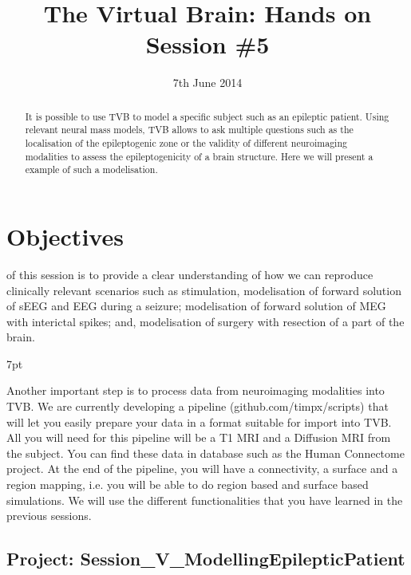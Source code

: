 \documentclass{tufte-handout}
\title{The Virtual Brain: Hands on Session \#5}
\date{7th June 2014}
\newenvironment{blah}{%
  \def\FrameCommand{%
    \hspace{1pt}%
    {\color{DarkOrange}\vrule width 2pt}%
    {\color{PeachPuff}\vrule width 4pt}%
    \colorbox{PeachPuff}%
  }%
  \MakeFramed{\advance\hsize-\width\FrameRestore}%
  \noindent\hspace{-4.55pt}%
  \begin{adjustwidth}{}{7pt}%
  \vspace{2pt}\vspace{2pt}%
}
{%
  \vspace{2pt}\end{adjustwidth}\endMakeFramed%
}
\begin{document}

\newpage
\ClearWallPaper


\begin{abstract}
\noindent It is possible to use TVB to model a specific subject such as an epileptic patient. Using relevant neural
mass models, TVB allows to ask multiple questions such as the localisation of the epileptogenic zone or the validity
of different neuroimaging modalities to assess the epileptogenicity of a brain structure. Here we will present a example of
such a modelisation.
\end{abstract}


 

\section{Objectives}\label{sec:objectives}
 of this session is to provide a clear understanding of how we can reproduce clinically
relevant scenarios such as stimulation, modelisation of forward solution of sEEG and EEG during a seizure; modelisation of
forward solution of MEG  with interictal spikes; and, modelisation of surgery with resection of a part of the brain.

\begin{blah}
Another important step is to process data from neuroimaging modalities into TVB. We are currently developing a pipeline (github.com/timpx/scripts) that will let you easily prepare your data in a format suitable for import
into TVB. All you will need for this pipeline will be a T1 MRI and a Diffusion MRI from the subject. You can find these data
in database such as the Human Connectome project. At the end of the pipeline, you will have a connectivity, a surface and a region mapping,
i.e. you will be able to do region based and surface based simulations.
We will use the different functionalities that you have learned in the previous sessions.
\end{blah}

\subsection{Project: Session\_V\_ModellingEpilepticPatient }\label{sec:project_data}
\end{document}
